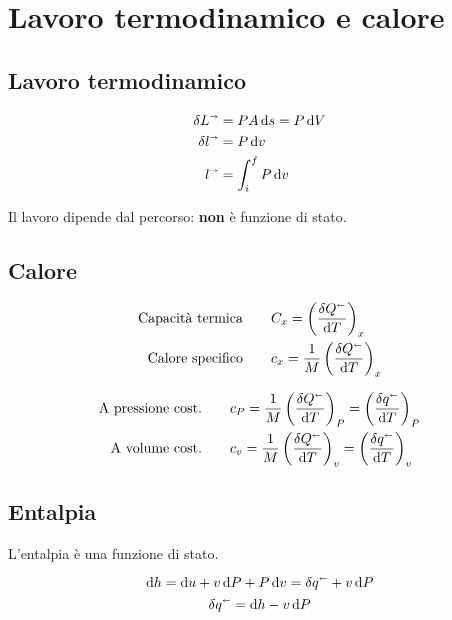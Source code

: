 \section{Lavoro termodinamico e calore}

\subsection{Lavoro termodinamico}

\begin{align*}
    \delta L^\shortrightarrow &= PA\dd{s} = P\dd{V} \\
    \delta l^\shortrightarrow &= P\dd{v} \\
    l^\shortrightarrow &= \int_i^f P\dd{v}
\end{align*}

Il lavoro dipende dal percorso: \textbf{non} è funzione di stato.

\subsection{Calore}

\begin{align*}
    \text{Capacità termica} &\qquad C_x = \left(\frac{\delta Q^\shortleftarrow}{\dd{T}}\right)_x \\
    \text{Calore specifico} &\qquad c_x = \frac{1}{M} \left(\frac{\delta Q^\shortleftarrow}{\dd{T}}\right)_x
\end{align*}

\begin{align*}
    \text{A pressione cost.} &\qquad c_P = \frac{1}{M} \left(\frac{\delta Q^\shortleftarrow}{\dd{T}}\right)_P = \left(\frac{\delta q^\shortleftarrow}{\dd{T}}\right)_P \\
    \text{A volume cost.} &\qquad c_v = \frac{1}{M} \left(\frac{\delta Q^\shortleftarrow}{\dd{T}}\right)_v = \left(\frac{\delta q^\shortleftarrow}{\dd{T}}\right)_v
\end{align*}

\subsection{Entalpia}

L'entalpia è una funzione di stato.

\[ \dd{h} = \dd{u} + v\dd{P} + P\dd{v} = \delta q^\shortleftarrow + v\dd{P} \]
\[ \delta q^\shortleftarrow = \dd{h} - v\dd{P} \]
